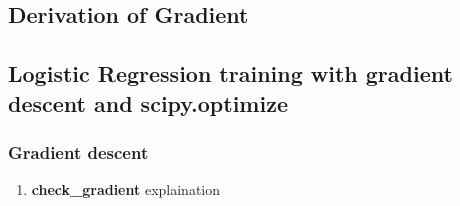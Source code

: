 \documentclass[12pt,halfline,a4paper]{ouparticle}
\begin{document}
\subsection{Derivation of Gradient}

\subsection{Logistic Regression training with gradient descent and scipy.optimize}

\subsubsection{Gradient descent}
\begin{enumerate}
  \item \textbf{check\_gradient} explaination
  

\end{enumerate}
\end{document}
